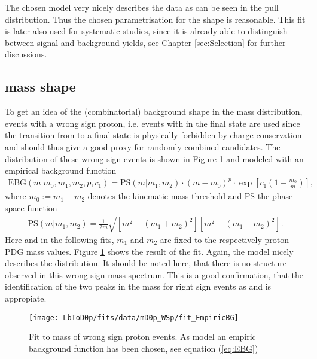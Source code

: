 The chosen model very nicely describes the data as can be seen in the pull distribution.
Thus the chosen parametrisation for the \logIP shape is reasonable.
This fit is later also used for systematic studies, since it is already able to distinguish between signal and background yields, see Chapter \ref{sec:Selection} for further discussions.

\subsection{\Dz\proton mass shape}
\label{sec:Shape_mD0p}
To get an idea of the (combinatorial) background shape in the \Dz\proton mass distribution, events with a wrong sign proton, i.e. events with \Dz\antiproton\mun in the final state are used since the transition from \Lb to a \Dz\antiproton\mun final state is physically forbidden by charge
conservation and should thus give a good proxy for randomly combined \LbToDpmunu candidates. 
The \MDp distribution of these wrong sign events is shown in Figure \ref{fig:fit_mD0p_WS} and modeled with an empirical background function
\begin{align}
    \text{EBG}(m|m_0, m_1, m_2, p,c_1) = \text{PS}(m|m_1,m_2) \cdot (m - m_0)^p \cdot \exp\left[ c_1 \left(1-\frac{m_0}{m}\right)\right], \label{eq:EBG}
\end{align}
where $m_0 := m_1 + m_2$ denotes the kinematic \Dz\proton mass threshold and PS the phase space function
\begin{align}
    \text{PS}(m|m_1,m_2) = \frac{1}{2m} \sqrt{\left[m^2 - (m_1 + m_2)^2\right] \left[m^2 - (m_1 - m_2)^2\right]}. \label{eq:PS}
\end{align}
Here and in the following fits, $m_1$ and $m_2$ are fixed to the \Dz respectively proton PDG mass values.
Figure \ref{fig:fit_mD0p_WS} shows the result of the fit.
Again, the model nicely describes the distribution.
It should be noted here, that there is no structure observed in this wrong sign mass spectrum.
This is a good confirmation, that the identification of the two peaks in the \Dz\proton mass for right sign events as \LcResI and \LcResII is appropiate.
\begin{figure}[ptb]
    \centering
	\texttt{[image: LbToD0p/fits/data/mD0p\_WSp/fit\_EmpiricBG]}
	\caption{Fit to \Dz\proton mass of wrong sign proton events.
             As model an empiric background function has been chosen, see equation (\ref{eq:EBG})}
    \label{fig:fit_mD0p_WS}
\end{figure}

